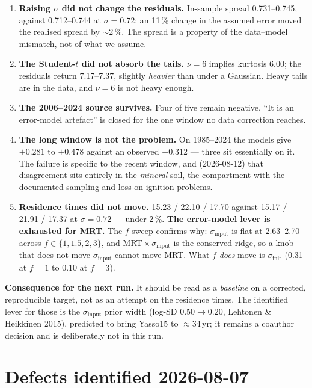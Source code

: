 \documentclass[11pt]{article}
\newcommand{\sinit}{\sigma_{\mathrm{init}}}
\newcommand{\sinput}{\sigma_{\mathrm{input}}}
\begin{document}
\begin{enumerate}\itemsep2pt
\item \textbf{Raising $\sigma$ did not change the residuals.} In-sample spread 0.731--0.745, against
  0.712--0.744 at $\sigma = 0.72$: an 11\,\% change in the assumed error moved the realised spread
  by ${\sim}2\,\%$. The spread is a property of the data--model mismatch, not of what we assume.
\item \textbf{The Student-$t$ did not absorb the tails.} $\nu = 6$ implies kurtosis 6.00; the
  residuals return 7.17--7.37, slightly \emph{heavier} than under a Gaussian. Heavy tails are in
  the data, and $\nu = 6$ is not heavy enough.
\item \textbf{The 2006--2024 source survives.} Four of five remain negative. ``It is an error-model
  artefact'' is closed for the one window no data correction reaches.
\item \textbf{The long window is not the problem.} On 1985--2024 the models give $+0.281$ to
  $+0.478$ against an observed $+0.312$ --- three sit essentially on it. The failure is specific to
  the recent window, and (2026-08-12) that disagreement sits entirely in the \emph{mineral} soil,
  the compartment with the documented sampling and loss-on-ignition problems.
\item \textbf{Residence times did not move.} 15.23 / 22.10 / 17.70 against 15.17 / 21.91 / 17.37 at
  $\sigma = 0.72$ --- under 2\,\%. \textbf{The error-model lever is exhausted for MRT.} The
  $f$-sweep confirms why: $\sinput$ is flat at 2.63--2.70 across $f \in \{1, 1.5, 2, 3\}$, and
  MRT\,$\times\,\sinput$ is the conserved ridge, so a knob that does not move $\sinput$ cannot move
  MRT. What $f$ \emph{does} move is $\sinit$ (0.31 at $f=1$ to 0.10 at $f=3$).
\end{enumerate}

\noindent\textbf{Consequence for the next run.} It should be read as a \emph{baseline} on a
corrected, reproducible target, not as an attempt on the residence times. The identified lever for
those is the $\sinput$ prior width (log-SD $0.50 \rightarrow 0.20$, Lehtonen \& Heikkinen 2015),
predicted to bring Yasso15 to ${\approx}34$\,yr; it remains a coauthor decision and is deliberately
not in this run.

\section{Defects identified 2026-08-07}\label{sec:defects}
\end{document}
